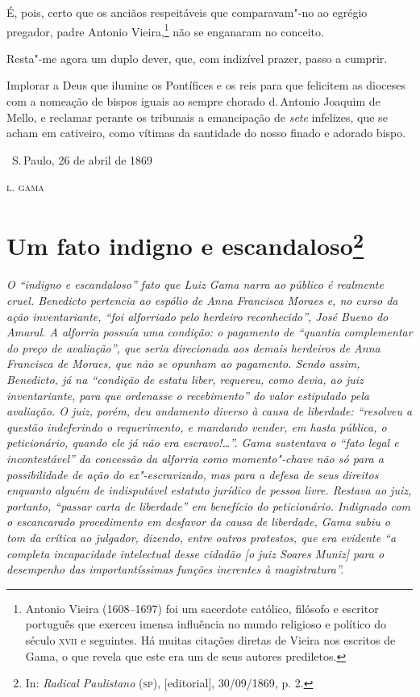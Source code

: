É, pois, certo que os anciãos respeitáveis que comparavam"-no ao egrégio
pregador, padre Antonio Vieira,\footnote{Antonio Vieira (1608--1697) foi
  um sacerdote católico, filósofo e escritor português que exerceu
  imensa influência no mundo religioso e político do século \textsc{xvii} e
  seguintes. Há muitas citações diretas de Vieira nos escritos de Gama,
  o que revela que este era um de seus autores prediletos.}
não se enganaram no conceito.

Resta"-me agora um duplo dever, que, com indizível prazer, passo a
cumprir.

Implorar a Deus que ilumine os Pontífices e os reis para que felicitem
as dioceses com a nomeação de bispos iguais ao sempre chorado d.\,Antonio
Joaquim de Mello, e reclamar perante os tribunais a emancipação de
\emph{sete} infelizes, que se acham em cativeiro, como vítimas da
santidade do nosso finado e adorado bispo.

\medskip

\hfill\ S.\,Paulo, 26 de abril de 1869\smallskip

\hfill\textsc{l. gama}


\chapter{Um fato indigno e escandaloso\footnote[*]{In: \emph{Radical
  Paulistano} (\textsc{sp}), {[}editorial{]}, 30/09/1869, p. 2.}}

\begin{flushleft}
{\footnotesize\itshape
O ``indigno e escandaloso'' fato que Luiz Gama narra ao público é
realmente cruel. Benedicto pertencia ao espólio de Anna Francisca Moraes
e, no curso da ação inventariante, ``foi alforriado pelo herdeiro
reconhecido'', José Bueno do Amaral. A alforria possuía uma condição: o
pagamento de ``quantia complementar do preço de avaliação'', que seria
direcionada aos demais herdeiros de Anna Francisca de Moraes, que não se
opunham ao pagamento. Sendo assim, Benedicto, já na ``condição de estatu
liber, requereu, como devia, ao juiz inventariante, para que ordenasse o
recebimento'' do valor estipulado pela avaliação. O juiz, porém, deu
andamento diverso à causa de liberdade: ``resolveu a questão indeferindo
o requerimento, e mandando vender, em hasta pública, o peticionário,
quando ele já não era escravo!\ldots{}''. Gama sustentava o ``fato legal e
incontestável'' da concessão da alforria como momento"-chave não só para a
possibilidade de ação do ex"-escravizado, mas para a defesa de seus
direitos enquanto alguém de indisputável estatuto jurídico de pessoa
livre. Restava ao juiz, portanto, ``passar carta de liberdade'' em
benefício do peticionário. Indignado com o escancarado procedimento em
desfavor da causa de liberdade, Gama subiu o tom da crítica ao julgador,
dizendo, entre outros protestos, que era evidente ``a completa
incapacidade intelectual desse cidadão {[}o juiz Soares Muniz{]} para o
desempenho das importantíssimas funções inerentes à magistratura''.}
\end{flushleft}

